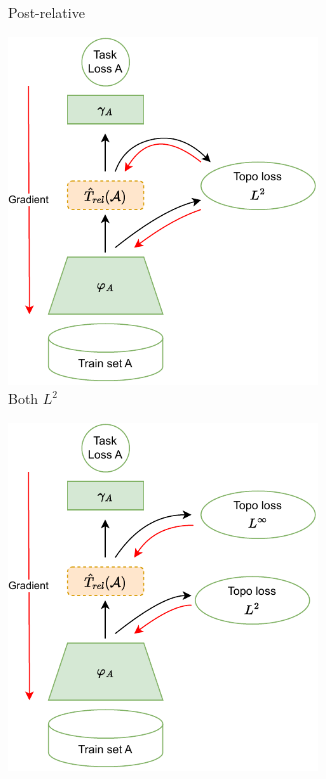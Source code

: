\documentclass[../main.tex]{subfiles}
\begin{document}
\begin{figure}[ht!]
\begin{subfigure}[b]{0.45\textwidth}
        \caption{Post-relative}
         \label{fig:relativeTopoPostScheme}
         \vspace*{3mm}
     \end{subfigure}
      \vspace{\fill}
       \begin{subfigure}[b]{0.45\textwidth}
         \centering
         \includegraphics[width=0.9\textwidth]{figures/mt/relativeTopoBothScheme.pdf}
        \caption{Both $L^2$}
         \label{fig:relativeTopoBothScheme}
     \end{subfigure}
      \hfill
      \begin{subfigure}[b]{0.45\textwidth}
         \centering
         \includegraphics[width=0.9\textwidth]{figures/mt/relativeTopoMixScheme.pdf}

\end{subfigure}
\end{figure}
\end{document}
